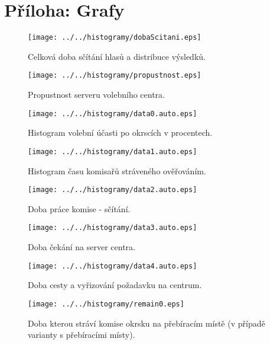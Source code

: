 \documentclass[12pt,a4paper,titlepage,final]{article}
\begin{document}
\section{Příloha: Grafy} \label{histograms}

\begin{figure}[H]
  \centering
  \texttt{[image: ../../histogramy/dobaScitani.eps]}
  \caption{Celková doba sčítání hlasů a distribuce výsledků.}
  \label{fig:priloha-dobaScitani}
\end{figure}

\begin{figure}[H]
  \centering
  \texttt{[image: ../../histogramy/propustnost.eps]}
  \caption{Propustnost serveru volebního centra.}
  \label{fig:priloha-propustnost}
\end{figure}

\begin{figure}[H]
  \centering
  \texttt{[image: ../../histogramy/data0.auto.eps]}
  \caption{Histogram volební účasti po okrscích v procentech.}
  \label{fig:priloha-data0}
\end{figure}

\begin{figure}[H]
  \centering
  \texttt{[image: ../../histogramy/data1.auto.eps]}
  \caption{Histogram času komisařů stráveného ověřováním.}
  \label{fig:priloha-data1}
\end{figure}

\begin{figure}[H]
  \centering
  \texttt{[image: ../../histogramy/data2.auto.eps]}
  \caption{Doba práce komise - sčítání.}
  \label{fig:priloha-data2}
\end{figure}

\begin{figure}[H]
  \centering
  \texttt{[image: ../../histogramy/data3.auto.eps]}
  \caption{Doba čekání na server centra.}
  \label{fig:priloha-data3}
\end{figure}

\begin{figure}[H]
  \centering
  \texttt{[image: ../../histogramy/data4.auto.eps]}
  \caption{Doba cesty a vyřizování požadavku na centrum.}
  \label{fig:priloha-data4}
\end{figure}

\begin{figure}[H]
  \centering
  \texttt{[image: ../../histogramy/remain0.eps]}
  \caption{Doba kterou stráví komise okrsku na přebíracím místě (v případě varianty s přebíracími místy).}
  \label{fig:priloha-remain0}
\end{figure}
\end{document}
